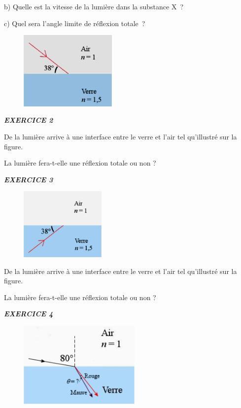 b) Quelle est la vitesse de la lumière dans la substance X~?

c) Quel sera l'angle limite de réflexion totale~?

\begin{figure}
\centering
\includegraphics[width=4.745cm,height=3.826cm]{Pictures/10000001000003C60000030BB07F4672F43BCB0A.png}
\caption{}
\end{figure}

\emph{\textbf{EXERCICE 2}}

De la lumière arrive à une interface entre le verre et l'air tel
qu'illustré sur la figure.

La lumière fera-t-elle une réflexion totale ou non\textbf{ }?

\emph{\textbf{EXERCICE 3}}

\begin{figure}
\centering
\includegraphics[width=4.175cm,height=3.538cm]{Pictures/100000010000031A000002A1271E381BD22001F0.png}
\caption{}
\end{figure}

De la lumière arrive à une interface entre le verre et l'air tel
qu'illustré sur la figure.

La lumière fera-t-elle une réflexion totale ou non\textbf{ }?

\emph{\textbf{EXERCICE 4}}

\begin{figure}
\centering
\includegraphics[width=5.944cm,height=4.209cm]{Pictures/10000001000003DA000002BA1D52E5C4A7536E3C.png}
\caption{}
\end{figure}

